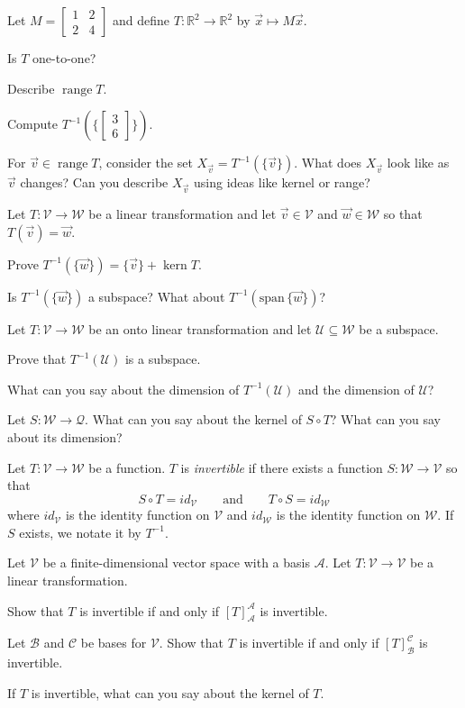 \documentclass[14pt]{problemset}
\newcommand{\R}{\mathbb{R}}
\newcommand{\Span}{\mathrm{span}\,}
\newcommand{\mat}[1]{\begin{bmatrix}#1\end{bmatrix}}
\newcommand{\Kern}{\operatorname{kern}}
\newcommand{\Range}{\operatorname{range}}
\begin{document}
	\question
		Let $M=\mat{1&2\\2&4}$ and define $T:\R^2\to\R^2$ by $\vec x\mapsto M\vec x$.
	\begin{parts}
		\item Is $T$ one-to-one?
		\item Describe $\Range T$.
		\item Compute $T^{-1}(\{\mat{3\\6}\})$.
		\item For $\vec v\in\Range T$, consider the set $X_{\vec v}=T^{-1}(\{\vec v\})$. What does
			$X_{\vec v}$ look like as $\vec v$ changes? Can you describe $X_{\vec v}$ using ideas
			like kernel or range?
	\end{parts}

	\question
		Let $T:\mathcal V\to\mathcal W$ be a linear transformation and let $\vec v\in\mathcal V$ and
		$\vec w\in\mathcal W$ so that $T(\vec v)=\vec w$.
	\begin{parts}
		\item Prove $T^{-1}(\{\vec w\}) = \{\vec v\}+\Kern T$.
		\item Is $T^{-1}(\{\vec w\})$ a subspace? What about $T^{-1}(\Span\{\vec w\})$?
	\end{parts}

	\question
		Let $T:\mathcal V\to\mathcal W$ be an onto linear transformation and let $\mathcal U\subseteq \mathcal W$
		be a subspace.
	\begin{parts}
		\item Prove that $T^{-1}(\mathcal U)$ is a subspace.
		\item What can you say about the dimension of $T^{-1}(\mathcal U)$ and
			the dimension of $\mathcal U$?
		\item Let $S:\mathcal W\to\mathcal Q$. What can you say about the kernel of
			$S\circ T$? What can you say about its dimension?
	\end{parts}

	\begin{definition}[Inverse]
		Let $T:\mathcal V\to\mathcal W$ be a function. $T$ is
		\emph{invertible} if there exists a function $S:\mathcal W\to\mathcal V$ so that
		\[
			S\circ T=id_{\mathcal V}\qquad\text{and}\qquad T\circ S=id_{\mathcal W}
		\]
		where $id_{\mathcal V}$ is the identity function on $\mathcal V$ and $id_{\mathcal W}$
		is the identity function on $\mathcal W$.
		If $S$ exists, we notate it by $T^{-1}$.
	\end{definition}

	\question
	Let $\mathcal V$ be a finite-dimensional vector space
	with a basis $\mathscr A$. Let $T:\mathcal V\to\mathcal V$ be a linear transformation.
	\begin{parts}
		\item Show that $T$ is invertible if and only if $[T]_{\mathscr A}^{\mathscr A}$ is invertible.
		\item Let $\mathscr B$ and $\mathscr C$ be bases for $\mathcal V$. Show that $T$ is invertible if
			and only if $[T]_{\mathscr B}^{\mathscr C}$ is invertible.
		\item If $T$ is invertible, what can you say about the kernel of $T$.
	\end{parts}
\end{document}
